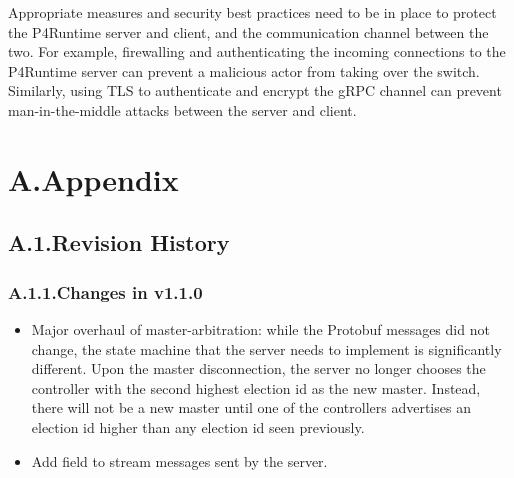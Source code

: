 \documentclass[11pt]{article}
\begin{document}
{%
\noindent{}Appropriate measures and security best practices need to be in place to protect
the P4Runtime server and client, and the communication channel between the two.
For example, firewalling and authenticating the incoming connections to the
P4Runtime server can prevent a malicious actor from taking over the switch.
Similarly, using TLS to authenticate and encrypt the gRPC channel can prevent
man-in-the-middle attacks between the server and client.%

\section{A.\hspace*{0.5em}Appendix}\label{sec-appendix}%

\subsection{A.1.\hspace*{0.5em}Revision History}\label{sec-revision-history}%

\subsubsection{A.1.1.\hspace*{0.5em}Changes in v1.1.0}\label{sec-changes-in-v110}%

\begin{itemize}[noitemsep,topsep=\mdcompacttopsep]%

\item{}Major overhaul of master-arbitration: while the Protobuf messages did not
change, the state machine that the server needs to implement is significantly
different. Upon the master disconnection, the server no longer chooses the
controller with the second highest election id as the new master. Instead,
there will not be a new master until one of the controllers advertises an
election id higher than any election id seen previously.%

\item{}Add  field to stream messages sent by the server.%


\end{itemize}}
\end{document}
